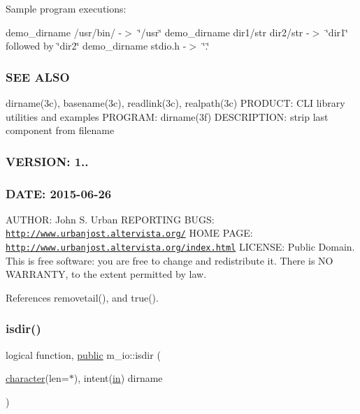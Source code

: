 Sample program executions\+:

demo\+\_\+dirname /usr/bin/ -\/$>$ \char`\"{}/usr\char`\"{} demo\+\_\+dirname dir1/str dir2/str -\/$>$ \char`\"{}dir1\char`\"{} followed by \char`\"{}dir2\char`\"{} demo\+\_\+dirname stdio.\+h -\/$>$ \char`\"{}.\char`\"{}

\subsubsection*{S\+EE A\+L\+SO}

dirname(3c), basename(3c), readlink(3c), realpath(3c) P\+R\+O\+D\+U\+CT\+: C\+LI library utilities and examples P\+R\+O\+G\+R\+AM\+: dirname(3f) D\+E\+S\+C\+R\+I\+P\+T\+I\+ON\+: strip last component from filename \subsubsection*{V\+E\+R\+S\+I\+ON\+: 1..}

\subsubsection*{D\+A\+TE\+: 2015-\/06-\/26}

A\+U\+T\+H\+OR\+: John S. Urban R\+E\+P\+O\+R\+T\+I\+NG B\+U\+GS\+: \href{http://www.urbanjost.altervista.org/}{\tt http\+://www.\+urbanjost.\+altervista.\+org/} H\+O\+ME P\+A\+GE\+: \href{http://www.urbanjost.altervista.org/index.html}{\tt http\+://www.\+urbanjost.\+altervista.\+org/index.\+html} L\+I\+C\+E\+N\+SE\+: Public Domain. This is free software\+: you are free to change and redistribute it. There is NO W\+A\+R\+R\+A\+N\+TY, to the extent permitted by law. 

References removetail(), and true().

\mbox{\label{namespacem__io_a6793f5adc45177098781af4be39911ff}} 
\subsubsection{\texorpdfstring{isdir()}{isdir()}}
{\footnotesize\ttfamily logical function, \hyperlink{M__stopwatch_83_8txt_a2f74811300c361e53b430611a7d1769f}{public} m\+\_\+io\+::isdir (\begin{DoxyParamCaption}\item[{\hyperlink{option__stopwatch_83_8txt_abd4b21fbbd175834027b5224bfe97e66}{character}(len=$\ast$), intent(\hyperlink{M__journal_83_8txt_afce72651d1eed785a2132bee863b2f38}{in})}]{dirname }\end{DoxyParamCaption})}



